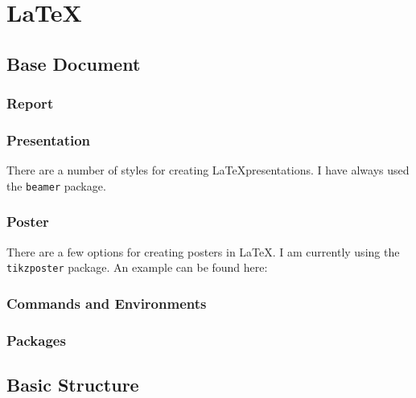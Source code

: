 \chapter{\LaTeX}
\label{latex}

\section{Base Document}


\subsection{Report}
\subsection{Presentation}

There are a number of styles for creating \LaTeX presentations. I have always used the \texttt{beamer} package.


\subsection{Poster}

There are a few options for creating posters in \LaTeX. I am currently using the \texttt{tikzposter} package. An example can be found here:


\subsection{Commands and Environments}



\subsection{Packages}

\section{Basic Structure}
